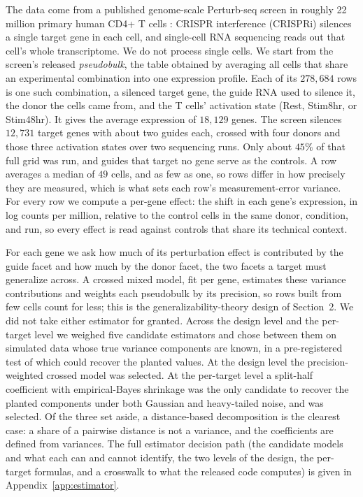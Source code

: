 \documentclass[11pt]{article}
\begin{document}
The data come from a published genome-scale Perturb-seq screen in roughly 22 million
primary human CD4+ T cells \parencite{zhu2025}: CRISPR interference (CRISPRi) silences
a single target gene in each cell, and single-cell RNA sequencing reads out that
cell's whole transcriptome. We do not process single cells. We start from the
screen's released \emph{pseudobulk}, the table obtained by averaging all cells that
share an experimental combination into one expression profile. Each of its
$278{,}684$ rows is one such combination, a silenced target gene, the guide RNA used
to silence it, the donor the cells came from, and the T cells' activation state (Rest, Stim8hr,
or Stim48hr). It gives the average expression of $18{,}129$ genes. The screen silences $12{,}731$ target
genes with about two guides each, crossed with four donors and those three
activation states over two sequencing runs. Only about $45\%$ of
that full grid was run, and guides that target no gene serve as the controls. A row
averages a median of $49$ cells, and as few as one, so rows differ in how precisely
they are measured, which is what sets each row's measurement-error variance. For every
row we compute a per-gene effect: the shift in each gene's expression, in log counts
per million, relative to the control cells in the same donor, condition, and run, so
every effect is read against controls that share its technical context.

For each gene we ask how much of its perturbation effect is contributed by the guide
facet and how much by the donor facet, the two facets a target must generalize
across. A crossed mixed model, fit per gene, estimates these variance contributions
and weights each pseudobulk by its precision, so rows built from few cells count for
less; this is the generalizability-theory design of Section~2.
We did not take either estimator for granted. Across the design level and the
per-target level we weighed five candidate estimators and chose between them on
simulated data whose true variance components are known, in a pre-registered test of
which could recover the planted values. At the design level the precision-weighted
crossed model was selected. At the per-target level a split-half coefficient with
empirical-Bayes shrinkage was the only candidate to recover the planted components
under both Gaussian and heavy-tailed noise, and was selected. Of the three set aside,
a distance-based decomposition is the clearest case: a share of a pairwise distance
is not a variance, and the coefficients are defined from variances. The full estimator decision path (the candidate models and what each
can and cannot identify, the two levels of the design, the per-target formulas, and a
crosswalk to what the released code computes) is given in
Appendix~\ref{app:estimator}.
\end{document}
